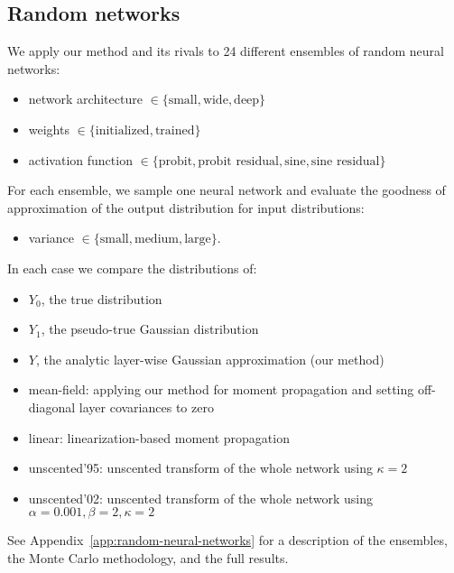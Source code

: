 \documentclass{article}
\begin{document}
\subsection{Random networks}
\label{sec:random-networks}
We apply our method and its rivals to 24 different ensembles of random neural networks:
\begin{itemize}
  \item network architecture \( \in \{\text{small}, \text{wide}, \text{deep}\} \)
  \item weights \( \in \{\text{initialized}, \text{trained}\} \)
  \item activation function \( \in \{\text{probit}, \text{probit residual}, \text{sine}, \text{sine residual}\} \)
\end{itemize}
For each ensemble, we sample one neural network and evaluate the goodness of approximation of the output distribution for input distributions: 
\begin{itemize}
  \item variance \( \in \{\text{small}, \text{medium}, \text{large}\} \).
\end{itemize}
In each case we compare the distributions of:
\begin{itemize}
  \item \(Y_0\), the true distribution
  \item \(Y_1\), the pseudo-true Gaussian distribution
  \item \(Y\), the analytic layer-wise Gaussian approximation (our method)
  \item mean-field: applying our method for moment propagation and setting off-diagonal layer covariances to zero
  \item linear: linearization-based moment propagation
  \item unscented'95: unscented transform of the whole network using \(\kappa=2\)
  \item unscented'02: unscented transform of the whole network using \(\alpha=0.001, \beta=2, \kappa=2\)
\end{itemize}
See Appendix~\ref{app:random-neural-networks} for a description of the ensembles, the Monte Carlo methodology, and the full results.

\end{document}
